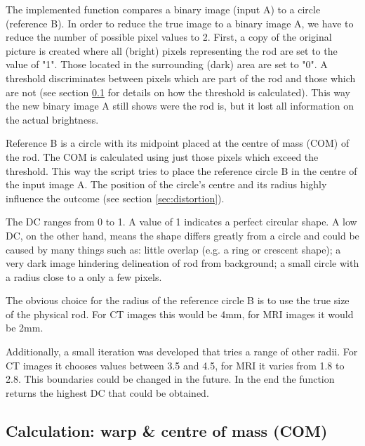 The implemented function compares a binary image (input A) to a circle (reference B).
In order to reduce the true image to a binary image A, we have to reduce the number of possible pixel values to 2.
First, a copy of the original picture is created where all (bright) pixels representing the rod are set to the value of "1".
Those located in the surrounding (dark) area are set to "0".
A threshold discriminates between pixels which are part of the rod and those which are not (see section \ref{sec:COM} for details on how the threshold is calculated).
This way the new binary image A still shows were the rod is, but it lost all information on the actual brightness.

Reference B is a circle with its midpoint placed at the centre of mass (COM) of the rod.
The COM is calculated using just those pixels which exceed the threshold.
This way the script tries to place the reference circle B in the centre of the input image A.
The position of the circle's centre and its radius highly influence the outcome (see section \ref{sec:distortion}).

The DC ranges from 0 to 1.
A value of 1 indicates a perfect circular shape.
A low DC, on the other hand, means the shape differs greatly from a circle and could be caused by many things such as:
little overlap (e.g. a ring or crescent shape); a very dark image hindering delineation of rod from background; a small circle with a radius close to a only a few pixels.

The obvious choice for the radius of the reference circle B is to use the true size of the physical rod.
For CT images this would be 4mm, for MRI images it would be 2mm.

Additionally, a small iteration was developed that tries a range of other radii.
For CT images it chooses values between 3.5 and 4.5, for MRI it varies from 1.8 to 2.8.
This boundaries could be changed in the future.
In the end the function returns the highest DC that could be obtained.



\subsection{Calculation: warp \& centre of mass (COM)}
\label{sec:COM}

